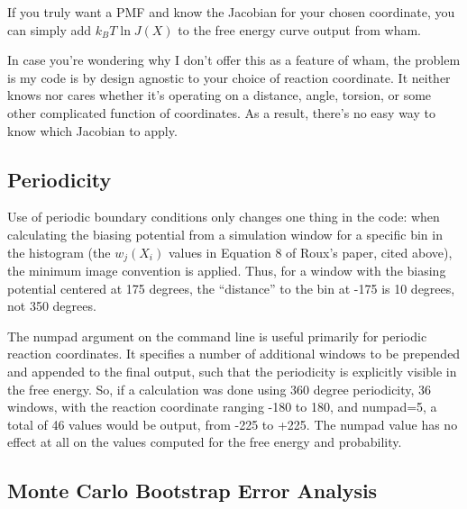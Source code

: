 \documentclass[12pt]{article}
\begin{document}
If you truly want a PMF and know the Jacobian for your chosen coordinate, you
can simply add $k_B T \ln J(X)$ to the free energy curve output from wham.

In case you're wondering why I don't offer this as a feature of wham, the
problem is my code is by design agnostic to your choice of reaction coordinate.
It neither knows nor cares whether it's operating on a distance, angle, torsion,
or some other complicated function of coordinates. As a result, there's no easy
way to know which Jacobian to apply.


\subsection{Periodicity}

Use of periodic boundary conditions only changes one thing in the
code: when calculating the biasing potential from a simulation window for a
specific bin in the histogram (the $w_j(X_i)$ values in Equation 8 of Roux's
paper, cited above), the minimum image convention is applied.  Thus, for a
window with the biasing potential centered at 175 degrees, the ``distance''
to the bin at -175 is 10 degrees, not 350 degrees.

The numpad argument on the command line is useful primarily for periodic
reaction coordinates.  It specifies a number of additional windows to be
prepended and appended to the final output, such that the periodicity is
explicitly visible in the free energy.  So, if a calculation was done using
360 degree periodicity, 36 windows, with the reaction coordinate ranging
-180 to 180, and numpad=5, a total of 46 values would be output, from -225
to +225.  The numpad value has no effect at all on the values computed for
the free energy and probability.

\subsection{Monte Carlo Bootstrap Error Analysis}
\label{ss:bootstrap}
\end{document}
